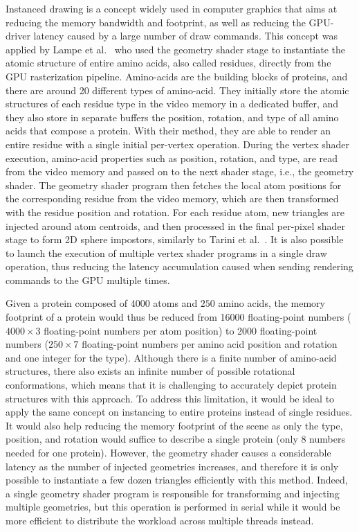 Instanced drawing is a concept widely used in computer graphics that aims at reducing the memory bandwidth and footprint, as well as reducing the GPU-driver latency caused by a large number of draw commands.
This concept was applied by Lampe et al.~\cite{lampe2007two} who used the geometry shader stage to instantiate the atomic structure of entire amino acids, also called residues, directly from the GPU rasterization pipeline.
Amino-acids are the building blocks of proteins, and there are around 20 different types of amino-acid.
They initially store the atomic structures of each residue type in the video memory in a dedicated buffer, and they also store in separate buffers the position, rotation, and type of all amino acids that compose a protein.
With their method, they are able to render an entire residue with a single initial per-vertex operation.
During the vertex shader execution, amino-acid properties such as position, rotation, and type, are read from the video memory and passed on to the next shader stage, i.e., the geometry shader.
The geometry shader program then fetches the local atom positions for the corresponding residue from the video memory, which are then transformed with the residue position and rotation.
For each residue atom, new triangles are injected around atom centroids, and then processed in the final per-pixel shader stage to form 2D sphere impostors, similarly to Tarini et al.~\cite{tarini2006ambient}.
It is also possible to launch the execution of multiple vertex shader programs in a single draw operation, thus reducing the latency accumulation caused when sending rendering commands to the GPU multiple times.

Given a protein composed of $4000$ atoms and $250$ amino acids, the memory footprint of a protein would thus be reduced from 16000 floating-point numbers ($4000 \times 3$ floating-point numbers per atom position) to 2000 floating-point numbers ($250 \times 7$ floating-point numbers per amino acid position and rotation and one integer for the type).
Although there is a finite number of amino-acid structures, there also exists an infinite number of possible rotational conformations, which means that it is challenging to accurately depict protein structures with this approach.
To address this limitation, it would be ideal to apply the same concept on instancing to entire proteins instead of single residues.
It would also help reducing the memory footprint of the scene as only the type, position, and rotation would suffice to describe a single protein (only 8 numbers needed for one protein).
However, the geometry shader causes a considerable latency as the number of injected geometries increases, and therefore it is only possible to instantiate a few dozen triangles efficiently with this method.
Indeed, a single geometry shader program is responsible for transforming and injecting multiple geometries, but this operation is performed in serial while it would be more efficient to distribute the workload across multiple threads instead.

